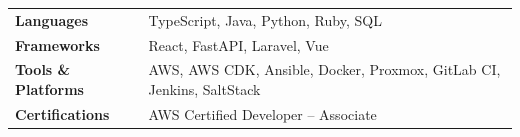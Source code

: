 

\begin{tabularx}{\textwidth}{@{}lX@{}}
    \textbf{Languages}           & TypeScript, Java, Python, Ruby, SQL \\[0.4em]
    \textbf{Frameworks}          & React, FastAPI, Laravel, Vue \\[0.4em]
    \textbf{Tools \& Platforms}  & AWS, AWS CDK, Ansible, Docker, Proxmox, GitLab CI, Jenkins, SaltStack \\[0.4em]
    \textbf{Certifications}      & AWS Certified Developer -- Associate \\
\end{tabularx}

